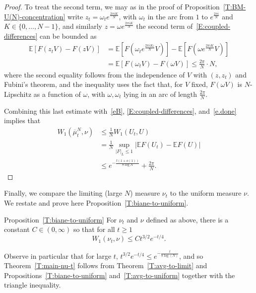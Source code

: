 \documentclass[11pt]{article}
\theoremstyle{definition}
\newenvironment{enonce*}[2][]{\par\medskip\noindent\textbf{#2.}\itshape}{\par\medskip}
\numberwithin{equation}{section}
\numberwithin{figure}{section}
\numberwithin{table}{section}
\newcommand{\E}{\mathbb{E}}
\begin{document}
\begin{proof}
To treat the second term, we may as in the proof of Proposition~\ref{T:BM-U(N)-concentration} write $z_t=\omega_te^{\frac{2\pi i K}{N}}$, with $\omega_t$ in the arc from $1$ to $e^{\frac{2\pi i}{N}}$ and $K\in\{0,\ldots,N-1\}$, and similarly $z=\omega e^{\frac{2\pi i K}{N}}$ the second term of~\eqref{E:coupled-differences} can be bounded as
\begin{align*}
\E\left[F(z_tV)-F(zV)\right] &=\E\left[F(\omega_te^{\frac{2\pi i K_t}{N}}V)\right]-\E\left[F(\omega e^{\frac{2\pi i K}{N}}V)\right] \\
&= \E\left[F(\omega_tV)-F(\omega V)\right]
\le \frac{2\pi}{N}\cdot N,
\end{align*}
where the second equality follows from the independence of $V$ with $(z,z_t)$ and Fubini's theorem, and the inequality uses the fact that, for $V$ fixed, $F(\omega V)$ is $N$-Lipschitz as a function of $\omega$, with $\omega,\omega_t$ lying in an arc of length $\frac{2\pi}{N}$.

Combining this last estimate with~\eqref{eB}, \eqref{E:coupled-differences}, and~\eqref{e.done} implies that
\begin{equation*}
\begin{split}
W_1(\overline{\mu}^N_t,\nu)&\le\frac{1}{N}W_1(U_t,U)\\&=\frac{1}{N}\sup_{|F|_L\le1}\big|\E F(U_t)-\E F(U)\big|\\&\le e^{-\frac{t(1+o(1))}{8\log N}}+\frac{2\pi}{N}.
\end{split}
\end{equation*}
\end{proof}

Finally, we compare the limiting (large $N$) measure $\nu_t$ to the uniform measure $\nu$. We restate and prove here Proposition~\ref{T:biane-to-uniform}.

\begin{enonce*}{Proposition~\ref{T:biane-to-uniform}}
For $\nu_t$ and $\nu$ defined as above, there is a constant $C\in(0,\infty)$ so that for all $t\ge1$
\[
W_1(\nu_t,\nu)\le Ct^{3/2}e^{-t/4}.
\]
\end{enonce*}

Observe in particular that for large $t$, $t^{3/2}e^{-t/4}\le e^{-\frac{t}{8\log(N)}}$, and so Theorem~\ref{T:main-nu-t} follows from Theorem~\ref{T:avg-to-limit} and Propositions~\ref{T:biane-to-uniform} and~\ref{T:avg-to-uniform} together with the triangle inequality.
\end{document}
